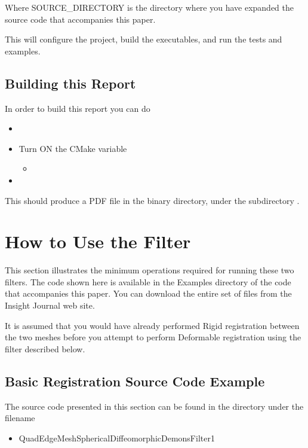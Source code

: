 \documentclass{InsightArticle}
\begin{document}
Where SOURCE\_DIRECTORY is the directory where you have expanded the source
code that accompanies this paper.

This will configure the project, build the executables, and run the tests and
examples. 


\subsection{Building this Report}

In order to build this report you can do

\begin{itemize}
\item {}
\item Turn ON the CMake variable
\begin{itemize}
\item {}
\end{itemize}
\item {}
\end{itemize}

This should produce a PDF file in the binary directory, under the subdirectory
.

\section{How to Use the Filter}

This section illustrates the minimum operations required for running these two
filters. The code shown here is available in the Examples directory of the code
that accompanies this paper. You can download the entire set of files from the
Insight Journal web site.

It is assumed that you would have already performed Rigid registration between
the two meshes before you attempt to perform Deformable registration using the
filter described below.


\subsection{Basic Registration Source Code Example}

The source code presented in this section can be found in the 
directory under the filename

\begin{itemize}
\item QuadEdgeMeshSphericalDiffeomorphicDemonsFilter1
\end{itemize}
\end{document}
